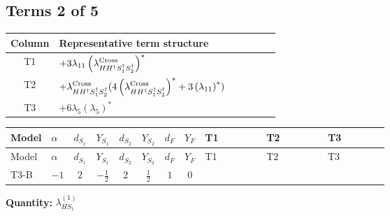 \documentclass[8pt]{article}
\begin{document}
\begin{landscape}
\subsection*{Terms 2 of 5}
\begin{center}
\begin{tabular}{@{}c >{\raggedright\arraybackslash}p{0.82\linewidth}@{}}
\toprule
Column & Representative term structure \\
\midrule
T1 & \(\displaystyle +3 {\lambda_{11}} \left({\lambda_{H H^\dagger S_1^\dagger S_2^\dagger}^{\rm Cross}}\right)^{*}\) \\
\midrule
T2 & \(\displaystyle +{\lambda_{H H^\dagger S_1^\dagger S_2^\dagger}^{\rm Cross}} (4 \left({\lambda_{H H^\dagger S_1^\dagger S_2^\dagger}^{\rm Cross}}\right)^{*}+3 \left({\lambda_{11}}\right)^{*})\) \\
\midrule
T3 & \(\displaystyle +6 {\lambda_5} \left({\lambda_5}\right)^{*}\) \\
\midrule
\bottomrule
\end{tabular}
\end{center}
\smallskip
\tiny
\begin{longtable}{@{}llcccccc >{\raggedright\arraybackslash}p{0.21\linewidth} >{\raggedright\arraybackslash}p{0.21\linewidth} >{\raggedright\arraybackslash}p{0.21\linewidth}@{}}
\toprule
Model & $\alpha$ & $d_{S_1}$ & $Y_{S_1}$ & $d_{S_2}$ & $Y_{S_2}$ & $d_F$ & $Y_F$ & T1 & T2 & T3 \\
\midrule
\endfirsthead
\toprule
Model & $\alpha$ & $d_{S_1}$ & $Y_{S_1}$ & $d_{S_2}$ & $Y_{S_2}$ & $d_F$ & $Y_F$ & T1 & T2 & T3 \\
\midrule
\endhead
T3-B & $-1$ & $2$ & $-\frac{1}{2}$ & $2$ & $\frac{1}{2}$ & $1$ & $0$ & \scriptsize\adjustbox{max width=\linewidth}{$\begin{gathered} +3 {\lambda_{11}} \left({\lambda_{H H^\dagger S_1^\dagger S_2^\dagger}^{\rm Cross}}\right)^{*}\end{gathered}$} & \scriptsize\adjustbox{max width=\linewidth}{$\begin{gathered} +{\lambda_{H H^\dagger S_1^\dagger S_2^\dagger}^{\rm Cross}} (4 \left({\lambda_{H H^\dagger S_1^\dagger S_2^\dagger}^{\rm Cross}}\right)^{*}+3 \left({\lambda_{11}}\right)^{*})\end{gathered}$} & \scriptsize\adjustbox{max width=\linewidth}{$\begin{gathered} +6 {\lambda_5} \left({\lambda_5}\right)^{*}\end{gathered}$} \\
\midrule
\bottomrule
\end{longtable}
\clearpage
\noindent\textbf{Quantity: }$\lambda_{HS_1}^{(1)}$\par\smallskip

\end{landscape}
\end{document}
